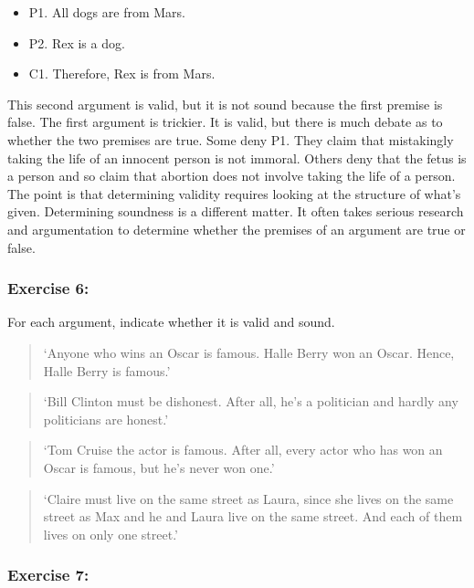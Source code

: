 \documentclass[]{article}
\providecommand{\tightlist}{%
  \setlength{\itemsep}{0pt}\setlength{\parskip}{0pt}}
\begin{document}
\begin{itemize}
\tightlist
\item
  P1. All dogs are from Mars.
\item
  P2. Rex is a dog.
\item
  C1. Therefore, Rex is from Mars.
\end{itemize}

This second argument is valid, but it is not sound because the first
premise is false. The first argument is trickier. It is valid, but there
is much debate as to whether the two premises are true. Some deny P1.
They claim that mistakingly taking the life of an innocent person is not
immoral. Others deny that the fetus is a person and so claim that
abortion does not involve taking the life of a person. The point is that
determining validity requires looking at the structure of what's given.
Determining soundness is a different matter. It often takes serious
research and argumentation to determine whether the premises of an
argument are true or false.

\subsubsection{Exercise 6:}\label{exercise-6}

For each argument, indicate whether it is valid and sound.

\begin{quote}
`Anyone who wins an Oscar is famous. Halle Berry won an Oscar. Hence,
Halle Berry is famous.'
\end{quote}

\begin{quote}
`Bill Clinton must be dishonest. After all, he's a politician and hardly
any politicians are honest.'
\end{quote}

\begin{quote}
`Tom Cruise the actor is famous. After all, every actor who has won an
Oscar is famous, but he's never won one.'
\end{quote}

\begin{quote}
`Claire must live on the same street as Laura, since she lives on the
same street as Max and he and Laura live on the same street. And each of
them lives on only one street.'
\end{quote}

\subsubsection{Exercise 7:}\label{exercise-7}
\end{document}
